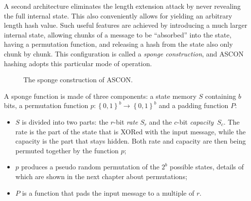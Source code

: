 A second architecture eliminates the length extension attack by never revealing the full internal state. This also conveniently allows for yielding an arbitrary length hash value. Such useful features are achieved by introducing a much larger internal state, allowing chunks of a message to be ``absorbed'' into the state, having a permutation function, and releasing a hash from the state also only chunk by chunk. This configuration is called a \textit{sponge construction}, and ASCON hashing adopts this particular mode of operation.

\begin{figure}[H]
    \centering
  \caption{The sponge construction of ASCON.}
\end{figure}
A sponge function is made of three components: a state memory $S$ containing $b$ bits, a permutation function $p: \left\{0,1\right\}^b \rightarrow \left\{0,1\right\}^b$ and a padding function $P$:

\begin{itemize}
  \item $S$ is divided into two parts: the $r$-bit \textit{rate} $S_r$ and the $c$-bit \textit{capacity}~$S_c$. The rate is the part of the state that is XORed with the input message, while the capacity is the part that stays hidden. Both rate and capacity are then being permuted together by the function $p$;
  \item $p$ produces a pseudo random permutation of the $2^b$ possible states, details of which are shown in the next chapter about permutations;
  \item $P$ is a function that pads the input message to a multiple of $r$.
\end{itemize}

